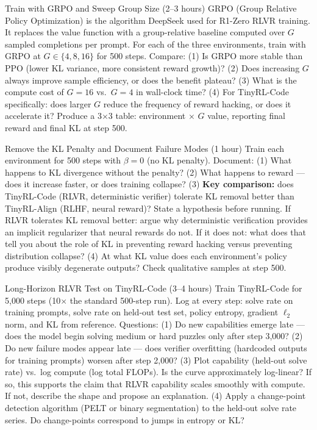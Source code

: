 \begin{exercise}{Train with GRPO and Sweep Group Size (2--3 hours)}
GRPO (Group Relative Policy Optimization) is the algorithm DeepSeek used for R1-Zero RLVR training. It replaces the value function with a group-relative baseline computed over $G$ sampled completions per prompt. For each of the three environments, train with GRPO at $G \in \{4, 8, 16\}$ for 500 steps. Compare: (1) Is GRPO more stable than PPO (lower KL variance, more consistent reward growth)? (2) Does increasing $G$ always improve sample efficiency, or does the benefit plateau? (3) What is the compute cost of $G=16$ vs.\ $G=4$ in wall-clock time? (4) For TinyRL-Code specifically: does larger $G$ reduce the frequency of reward hacking, or does it accelerate it? Produce a 3$\times$3 table: environment $\times$ $G$ value, reporting final reward and final KL at step 500.
\end{exercise}

\begin{exercise}{Remove the KL Penalty and Document Failure Modes (1 hour)}
Train each environment for 500 steps with $\beta = 0$ (no KL penalty). Document: (1) What happens to KL divergence without the penalty? (2) What happens to reward --- does it increase faster, or does training collapse? (3) \textbf{Key comparison:} does TinyRL-Code (RLVR, deterministic verifier) tolerate KL removal better than TinyRL-Align (RLHF, neural reward)? State a hypothesis before running. If RLVR tolerates KL removal better: argue why deterministic verification provides an implicit regularizer that neural rewards do not. If it does not: what does that tell you about the role of KL in preventing reward hacking versus preventing distribution collapse? (4) At what KL value does each environment's policy produce visibly degenerate outputs? Check qualitative samples at step 500.
\end{exercise}

\begin{exercise}{Long-Horizon RLVR Test on TinyRL-Code (3--4 hours)}
Train TinyRL-Code for 5{,}000 steps (10$\times$ the standard 500-step run). Log at every step: solve rate on training prompts, solve rate on held-out test set, policy entropy, gradient $\ell_2$ norm, and KL from reference. Questions: (1) Do new capabilities emerge late --- does the model begin solving medium or hard puzzles only after step 3{,}000? (2) Do new failure modes appear late --- does verifier overfitting (hardcoded outputs for training prompts) worsen after step 2{,}000? (3) Plot capability (held-out solve rate) vs.\ log compute (log total FLOPs). Is the curve approximately log-linear? If so, this supports the claim that RLVR capability scales smoothly with compute. If not, describe the shape and propose an explanation. (4) Apply a change-point detection algorithm (PELT or binary segmentation) to the held-out solve rate series. Do change-points correspond to jumps in entropy or KL?
\end{exercise}

